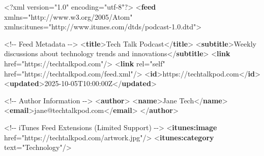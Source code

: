 \documentclass[
  letterpaper,
  DIV=11,
  numbers=noendperiod]{scrartcl}
\newenvironment{Shaded}{\begin{snugshade}}{\end{snugshade}}
\newcommand{\CommentTok}[1]{\textcolor[rgb]{0.37,0.37,0.37}{#1}}
\newcommand{\FunctionTok}[1]{\textcolor[rgb]{0.28,0.35,0.67}{#1}}
\newcommand{\KeywordTok}[1]{\textcolor[rgb]{0.00,0.23,0.31}{\textbf{#1}}}
\newcommand{\NormalTok}[1]{\textcolor[rgb]{0.00,0.23,0.31}{#1}}
\newcommand{\OtherTok}[1]{\textcolor[rgb]{0.00,0.23,0.31}{#1}}
\newcommand{\StringTok}[1]{\textcolor[rgb]{0.13,0.47,0.30}{#1}}
\begin{document}
\begin{Shaded}
\begin{Highlighting}[]
\FunctionTok{\textless{}?xml}\OtherTok{ version=}\StringTok{"1.0"}\OtherTok{ encoding=}\StringTok{"utf{-}8"}\FunctionTok{?\textgreater{}}
\NormalTok{\textless{}}\KeywordTok{feed}\OtherTok{ xmlns=}\StringTok{"http://www.w3.org/2005/Atom"} 
\OtherTok{      xmlns:itunes=}\StringTok{"http://www.itunes.com/dtds/podcast{-}1.0.dtd"}\NormalTok{\textgreater{}}
  
  \CommentTok{\textless{}!{-}{-} Feed Metadata {-}{-}\textgreater{}}
\NormalTok{  \textless{}}\KeywordTok{title}\NormalTok{\textgreater{}Tech Talk Podcast\textless{}/}\KeywordTok{title}\NormalTok{\textgreater{}}
\NormalTok{  \textless{}}\KeywordTok{subtitle}\NormalTok{\textgreater{}Weekly discussions about technology trends and innovations\textless{}/}\KeywordTok{subtitle}\NormalTok{\textgreater{}}
\NormalTok{  \textless{}}\KeywordTok{link}\OtherTok{ href=}\StringTok{"https://techtalkpod.com"}\NormalTok{/\textgreater{}}
\NormalTok{  \textless{}}\KeywordTok{link}\OtherTok{ rel=}\StringTok{"self"}\OtherTok{ href=}\StringTok{"https://techtalkpod.com/feed.xml"}\NormalTok{/\textgreater{}}
\NormalTok{  \textless{}}\KeywordTok{id}\NormalTok{\textgreater{}https://techtalkpod.com\textless{}/}\KeywordTok{id}\NormalTok{\textgreater{}}
\NormalTok{  \textless{}}\KeywordTok{updated}\NormalTok{\textgreater{}2025{-}10{-}05T10:00:00Z\textless{}/}\KeywordTok{updated}\NormalTok{\textgreater{}}
  
  \CommentTok{\textless{}!{-}{-} Author Information {-}{-}\textgreater{}}
\NormalTok{  \textless{}}\KeywordTok{author}\NormalTok{\textgreater{}}
\NormalTok{    \textless{}}\KeywordTok{name}\NormalTok{\textgreater{}Jane Tech\textless{}/}\KeywordTok{name}\NormalTok{\textgreater{}}
\NormalTok{    \textless{}}\KeywordTok{email}\NormalTok{\textgreater{}jane@techtalkpod.com\textless{}/}\KeywordTok{email}\NormalTok{\textgreater{}}
\NormalTok{  \textless{}/}\KeywordTok{author}\NormalTok{\textgreater{}}
  
  \CommentTok{\textless{}!{-}{-} iTunes Feed Extensions (Limited Support) {-}{-}\textgreater{}}
\NormalTok{  \textless{}}\KeywordTok{itunes:image}\OtherTok{ href=}\StringTok{"https://techtalkpod.com/artwork.jpg"}\NormalTok{/\textgreater{}}
\NormalTok{  \textless{}}\KeywordTok{itunes:category}\OtherTok{ text=}\StringTok{"Technology"}\NormalTok{/\textgreater{}}
  

\end{Highlighting}
\end{Shaded}
\end{document}
